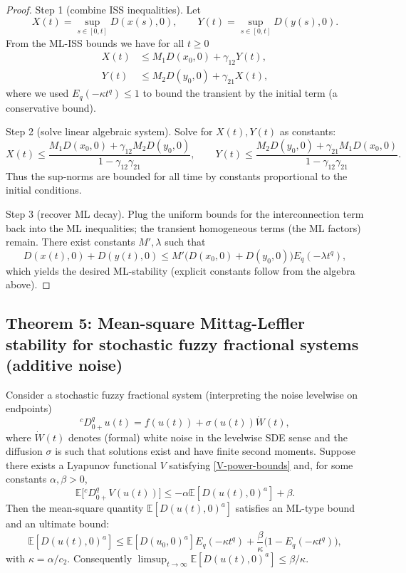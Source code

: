 \documentclass[11pt,a4paper]{article}
\theoremstyle{plain}
\theoremstyle{definition}
\theoremstyle{remark}
\newcommand{\Haus}{D}
\begin{document}
	\begin{proof}
		Step 1 (combine ISS inequalities). Let
		\[
		X(t)=\sup_{s\in[0,t]}\Haus(x(s),0),\qquad Y(t)=\sup_{s\in[0,t]}\Haus(y(s),0).
		\]
		From the ML-ISS bounds we have for all \(t\ge0\)
		\begin{align*}
			X(t) &\le M_1\Haus(x_0,0)+\gamma_{12}Y(t),\\
			Y(t) &\le M_2\Haus(y_0,0)+\gamma_{21}X(t),
		\end{align*}
		where we used \(E_q(-\kappa t^q)\le1\) to bound the transient by the initial term (a conservative bound).
		
		Step 2 (solve linear algebraic system). Solve for \(X(t),Y(t)\) as constants:
		\[
		X(t) \le \frac{M_1\Haus(x_0,0)+\gamma_{12}M_2\Haus(y_0,0)}{1-\gamma_{12}\gamma_{21}},\qquad
		Y(t) \le \frac{M_2\Haus(y_0,0)+\gamma_{21}M_1\Haus(x_0,0)}{1-\gamma_{12}\gamma_{21}}.
		\]
		Thus the sup-norms are bounded for all time by constants proportional to the initial conditions.
		
		Step 3 (recover ML decay). Plug the uniform bounds for the interconnection term back into the ML inequalities; the transient homogeneous terms (the ML factors) remain. There exist constants \(M',\lambda\) such that
		\[
		\Haus(x(t),0)+\Haus(y(t),0) \le M'\big(\Haus(x_0,0)+\Haus(y_0,0)\big) E_q(-\lambda t^q),
		\]
		which yields the desired ML-stability (explicit constants follow from the algebra above).
	\end{proof}
	
	\subsection{Theorem 5: Mean-square Mittag-Leffler stability for stochastic fuzzy fractional systems (additive noise)}
	
	Consider a stochastic fuzzy fractional system (interpreting the noise levelwise on endpoints)
	\[
	{}^cD_{0+}^q u(t) = f(u(t)) + \sigma(u(t))\dot W(t),
	\]
	where \(\dot W(t)\) denotes (formal) white noise in the levelwise SDE sense and the diffusion \(\sigma\) is such that solutions exist and have finite second moments. Suppose there exists a Lyapunov functional \(V\) satisfying \eqref{V-power-bounds} and, for some constants \(\alpha,\beta>0\),
	\[
	\mathbb{E}\big[{}^cD_{0+}^q V(u(t))\big] \le -\alpha \mathbb{E}[\Haus(u(t),0)^a] + \beta.
	\]
	Then the mean-square quantity \(\mathbb{E}[\Haus(u(t),0)^a]\) satisfies an ML-type bound and an ultimate bound:
	\[
	\mathbb{E}[\Haus(u(t),0)^a] \le \mathbb{E}[\Haus(u_0,0)^a] E_q(-\kappa t^q) + \frac{\beta}{\kappa}\big(1-E_q(-\kappa t^q)\big),
	\]
	with \(\kappa=\alpha/c_2\). Consequently \(\limsup_{t\to\infty}\mathbb{E}[\Haus(u(t),0)^a]\le \beta/\kappa\).
	
\end{document}
